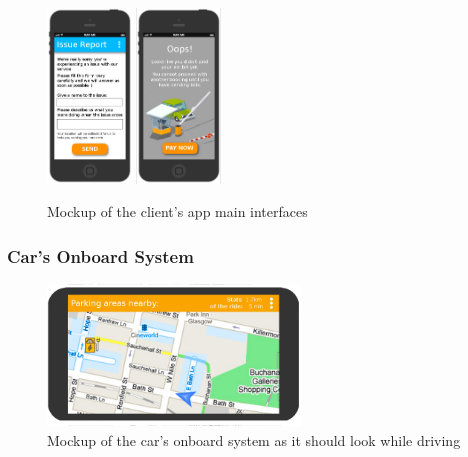 \documentclass[11pt]{article} %
\begin{document}
\begin{figure}[H]
	\includegraphics[width=0.2\textwidth]{mockup/12IssueReport.png} 	\hspace{0.8cm}
	\includegraphics[width=0.2\textwidth]{mockup/10PendingBills.png} 	%
	\caption{Mockup of the client's app main interfaces}
\end{figure}

\subsubsection{Car's Onboard System}
\begin{figure}[H]
	\centering
	\includegraphics[width=0.6\textwidth]{mockup/CarsSystem} 
	\caption{Mockup of the car's onboard system as it should look while driving}
\end{figure}
\end{document}
